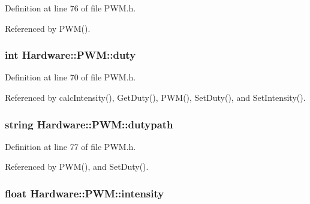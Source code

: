 Definition at line 76 of file P\+W\+M.\+h.



Referenced by P\+W\+M().

\hypertarget{class_hardware_1_1_p_w_m_a3309b2645c4c817384d91f33f0df5d64}{}
\subsubsection[{duty}]{\setlength{\rightskip}{0pt plus 5cm}int Hardware\+::\+P\+W\+M\+::duty\hspace{0.3cm}{\ttfamily [private]}}\label{class_hardware_1_1_p_w_m_a3309b2645c4c817384d91f33f0df5d64}


Definition at line 70 of file P\+W\+M.\+h.



Referenced by calc\+Intensity(), Get\+Duty(), P\+W\+M(), Set\+Duty(), and Set\+Intensity().

\hypertarget{class_hardware_1_1_p_w_m_a53311e9df6960751465d5f0b81192226}{}
\subsubsection[{dutypath}]{\setlength{\rightskip}{0pt plus 5cm}string Hardware\+::\+P\+W\+M\+::dutypath\hspace{0.3cm}{\ttfamily [private]}}\label{class_hardware_1_1_p_w_m_a53311e9df6960751465d5f0b81192226}


Definition at line 77 of file P\+W\+M.\+h.



Referenced by P\+W\+M(), and Set\+Duty().

\hypertarget{class_hardware_1_1_p_w_m_afcfc81ddeeb9c510ad4d00b215477d7a}{}
\subsubsection[{intensity}]{\setlength{\rightskip}{0pt plus 5cm}float Hardware\+::\+P\+W\+M\+::intensity\hspace{0.3cm}{\ttfamily [private]}}\label{class_hardware_1_1_p_w_m_afcfc81ddeeb9c510ad4d00b215477d7a}


